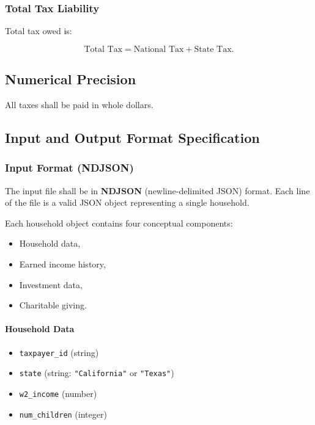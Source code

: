 \subsubsection{Total Tax Liability}

Total tax owed is:

\[
\text{Total Tax} =
\text{National Tax}
+
\text{State Tax}.
\]

\subsection{Numerical Precision}

All taxes shall be paid in whole dollars.

\subsection{Input and Output Format Specification}

\subsubsection{Input Format (NDJSON)}

The input file shall be in \textbf{NDJSON} (newline-delimited JSON) format.
Each line of the file is a valid JSON object representing a single household.

Each household object contains four conceptual components:

\begin{itemize}
  \item Household data,
  \item Earned income history,
  \item Investment data,
  \item Charitable giving.
\end{itemize}

\paragraph{Household Data}

\begin{itemize}
  \item \texttt{taxpayer\_id} (string)
  \item \texttt{state} (string: \texttt{"California"} or \texttt{"Texas"})
  \item \texttt{w2\_income} (number)
  \item \texttt{num\_children} (integer)
\end{itemize}

